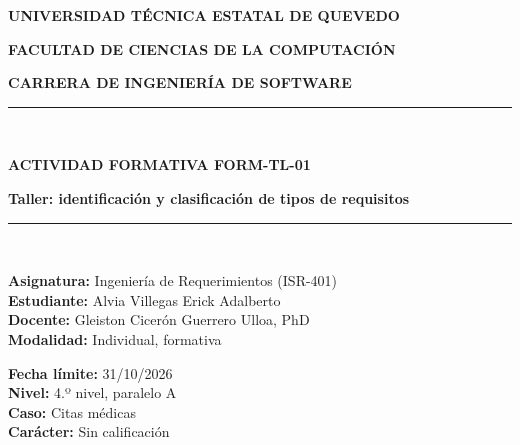 \documentclass[12pt,a4paper]{article}
\begin{document}
\begin{titlepage}
    \centering

    {\bfseries\Large UNIVERSIDAD TÉCNICA ESTATAL DE QUEVEDO \par}
    \vspace{0.2cm}
    {\bfseries\large FACULTAD DE CIENCIAS DE LA COMPUTACIÓN \par}
    {\bfseries\large CARRERA DE INGENIERÍA DE SOFTWARE \par}
    \vspace{0.4cm}

    \rule{\linewidth}{0.5mm} \\[0.3cm]
    {\huge\bfseries ACTIVIDAD FORMATIVA FORM-TL-01 \par}
    \vspace{0.2cm}
    {\large\bfseries Taller: identificación y clasificación de tipos de requisitos \par}
    \rule{\linewidth}{0.5mm} \\[0.6cm]

    \begin{minipage}{0.48\textwidth}
        \begin{flushleft} \large
            \textbf{Asignatura:} Ingeniería de Requerimientos (ISR-401)\\
            \textbf{Estudiante:} Alvia Villegas Erick Adalberto\\
            \textbf{Docente:} Gleiston Cicerón Guerrero Ulloa, PhD\\
            \textbf{Modalidad:} Individual, formativa
        \end{flushleft}
    \end{minipage}
    \begin{minipage}{0.48\textwidth}
        \begin{flushright} \large
            \textbf{Fecha límite:} 31/10/2026\\
            \textbf{Nivel:} 4.º nivel, paralelo A\\
            \textbf{Caso:} Citas médicas\\
            \textbf{Carácter:} Sin calificación
        \end{flushright}
    \end{minipage}

    \vspace{0.5cm}


\end{titlepage}
\end{document}
